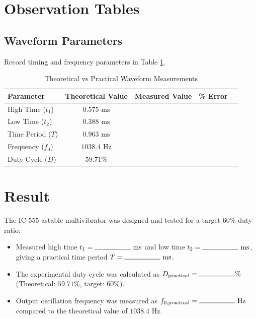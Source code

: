 \section{Observation Tables}

\subsection{Waveform Parameters}
Record timing and frequency parameters in Table \ref{tab:obs_astable_timing}.

\begin{table}[h!]
	\centering
	\caption{Theoretical vs Practical Waveform Measurements}
	\label{tab:obs_astable_timing}
	\begin{tabular}{lcccc}
		\toprule
		\textbf{Parameter} & \textbf{Theoretical Value} & \textbf{Measured Value} & \textbf{\% Error} \\
		\midrule
		High Time ($t_1$) & $0.575\text{ ms}$ & & \\
		Low Time ($t_2$) & $0.388\text{ ms}$ & & \\
		Time Period ($T$) & $0.963\text{ ms}$ & & \\
		Frequency ($f_0$) & $1038.4\text{ Hz}$ & & \\
		Duty Cycle ($D$) & $59.71\%$ & & \\
		\bottomrule
	\end{tabular}
\end{table}

\section{Result}
The IC 555 astable multivibrator was designed and tested for a target $60\%$ duty ratio:
\begin{itemize}
	\item Measured high time $t_1 = \rule{1.8cm}{0.15mm}\text{ ms}$ and low time $t_2 = \rule{1.8cm}{0.15mm}\text{ ms}$, giving a practical time period $T = \rule{1.8cm}{0.15mm}\text{ ms}$.
	\item The experimental duty cycle was calculated as $D_{\text{practical}} = \rule{1.8cm}{0.15mm}\%$ (Theoretical: $59.71\%$, target: $60\%$).
	\item Output oscillation frequency was measured as $f_{0,\text{practical}} = \rule{1.8cm}{0.15mm}\text{ Hz}$ compared to the theoretical value of $1038.4\text{ Hz}$.
\end{itemize}

